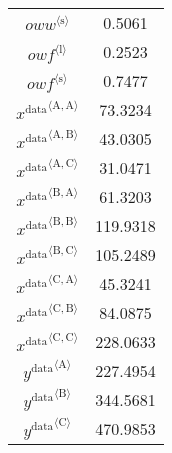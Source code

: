 \begin{tabular}{c|c|}
${{o\!w\!w}}^{\langle \mathrm{\mathrm{s}}\rangle}$ & 0.5061 \\
${{o\!w\!f}}^{\langle \mathrm{\mathrm{l}}\rangle}$ & 0.2523 \\
${{o\!w\!f}}^{\langle \mathrm{\mathrm{s}}\rangle}$ & 0.7477 \\
${x^{\mathrm{data}}}^{\langle \mathrm{\mathrm{A}},\mathrm{\mathrm{A}}\rangle}$ & 73.3234 \\
${x^{\mathrm{data}}}^{\langle \mathrm{\mathrm{A}},\mathrm{\mathrm{B}}\rangle}$ & 43.0305 \\
${x^{\mathrm{data}}}^{\langle \mathrm{\mathrm{A}},\mathrm{\mathrm{C}}\rangle}$ & 31.0471 \\
${x^{\mathrm{data}}}^{\langle \mathrm{\mathrm{B}},\mathrm{\mathrm{A}}\rangle}$ & 61.3203 \\
${x^{\mathrm{data}}}^{\langle \mathrm{\mathrm{B}},\mathrm{\mathrm{B}}\rangle}$ & 119.9318 \\
${x^{\mathrm{data}}}^{\langle \mathrm{\mathrm{B}},\mathrm{\mathrm{C}}\rangle}$ & 105.2489 \\
${x^{\mathrm{data}}}^{\langle \mathrm{\mathrm{C}},\mathrm{\mathrm{A}}\rangle}$ & 45.3241 \\
${x^{\mathrm{data}}}^{\langle \mathrm{\mathrm{C}},\mathrm{\mathrm{B}}\rangle}$ & 84.0875 \\
${x^{\mathrm{data}}}^{\langle \mathrm{\mathrm{C}},\mathrm{\mathrm{C}}\rangle}$ & 228.0633 \\
${y^{\mathrm{data}}}^{\langle \mathrm{\mathrm{A}}\rangle}$ & 227.4954 \\
${y^{\mathrm{data}}}^{\langle \mathrm{\mathrm{B}}\rangle}$ & 344.5681 \\
${y^{\mathrm{data}}}^{\langle \mathrm{\mathrm{C}}\rangle}$ & 470.9853 \\
\hline
\end{tabular}


